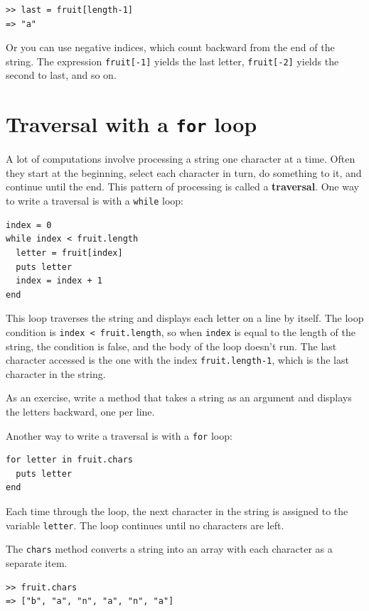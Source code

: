 \documentclass[10pt]{book}
\begin{document}
\begin{verbatim}
>> last = fruit[length-1]
=> "a"
\end{verbatim}
%
Or you can use negative indices, which count backward from
the end of the string.  The expression {\tt fruit[-1]} yields the last
letter, {\tt fruit[-2]} yields the second to last, and so on.


\section{Traversal with a {\tt for} loop}
\label{for}

A lot of computations involve processing a string one character at a
time.  Often they start at the beginning, select each character in
turn, do something to it, and continue until the end.  This pattern of
processing is called a {\bf traversal}.  One way to write a traversal
is with a {\tt while} loop:

\begin{verbatim}
index = 0
while index < fruit.length
  letter = fruit[index]
  puts letter
  index = index + 1
end
\end{verbatim}
%
This loop traverses the string and displays each letter on a line by
itself.  The loop condition is {\tt index < fruit.length}, so
when {\tt index} is equal to the length of the string, the
condition is false, and the body of the loop doesn't run.  The
last character accessed is the one with the index {\tt fruit.length-1},
which is the last character in the string.

As an exercise, write a method that takes a string as an argument
and displays the letters backward, one per line.

Another way to write a traversal is with a {\tt for} loop:

\begin{verbatim}
for letter in fruit.chars
  puts letter
end
\end{verbatim}
%
Each time through the loop, the next character in the string is assigned
to the variable {\tt letter}.  The loop continues until no characters are
left.

The {\tt chars} method converts a string into an array with each
character as a separate item.

\begin{verbatim}
>> fruit.chars
=> ["b", "a", "n", "a", "n", "a"]
\end{verbatim}
\end{document}
